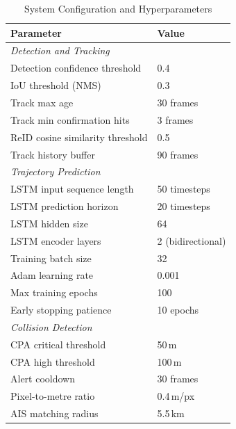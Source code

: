 \documentclass{ieeeaccess}
\begin{document}
\begin{table}[H]
\centering
\caption{System Configuration and Hyperparameters}
\label{tab:system}
\begin{tabular}{|l|l|}
\hline
\cellcolor{gray!30}\textbf{Parameter} & 
\cellcolor{gray!30}\textbf{Value} \\
\hline
\multicolumn{2}{|l|}{\textit{Detection and Tracking}} \\
\hline
Detection confidence threshold  & 0.4 \\
IoU threshold (NMS)             & 0.3 \\
Track max age                   & 30 frames \\
Track min confirmation hits     & 3 frames \\
ReID cosine similarity threshold & 0.5 \\
Track history buffer            & 90 frames \\
\hline
\multicolumn{2}{|l|}{\textit{Trajectory Prediction}} \\
\hline
LSTM input sequence length      & 50 timesteps \\
LSTM prediction horizon         & 20 timesteps \\
LSTM hidden size                & 64 \\
LSTM encoder layers             & 2 (bidirectional) \\
Training batch size             & 32 \\
Adam learning rate              & 0.001 \\
Max training epochs             & 100 \\
Early stopping patience         & 10 epochs \\
\hline
\multicolumn{2}{|l|}{\textit{Collision Detection}} \\
\hline
CPA critical threshold          & 50\,m \\
CPA high threshold              & 100\,m \\
Alert cooldown                  & 30 frames \\
Pixel-to-metre ratio            & 0.4\,m/px \\
AIS matching radius             & 5.5\,km \\
\hline
\end{tabular}
\end{table}

\end{document}
